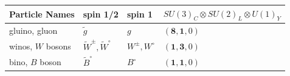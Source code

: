 {\begin{center}
\centering
\begin{tabular}{l|l| l| l}
\toprule
\bfseries{Particle Names} & \bfseries {spin 1/2} & \bfseries{spin 1} & \bfseries{$SU(3)_{C}\otimes SU(2)_{L}\otimes U(1)_{Y}$} \\
\hline \hline
gluino, gluon & $\tilde{g}$  & $g$ &  $(\mathbf{8}, \mathbf{1}, 0)$ \\
\hline
winos, $W$ bosons & $\tilde{W}^{\pm}, \tilde{W}^{\circ}$ & $W^{\pm}, W^{\circ}$ & $(\mathbf{1}, \mathbf{3}, 0)$ \\
\hline
bino, $B$ boson & $\tilde{B}^{\circ}$ & $ B^{\circ}$  & $(\mathbf{1}, \mathbf{1}, 0)$ \\
\hline 
\bottomrule
\end{tabular}
\label{tab:SUSYG} 
\end{center}



}

